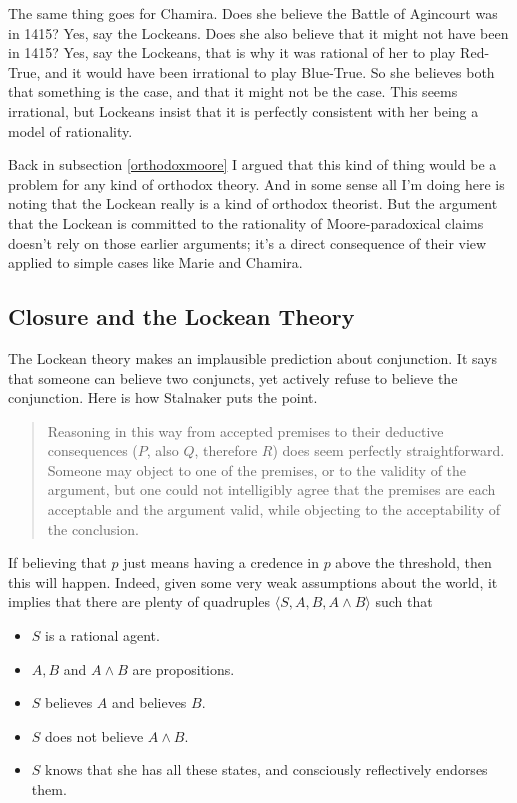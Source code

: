\documentclass[11pt,]{book}
\providecommand{\tightlist}{%
  \setlength{\itemsep}{0pt}\setlength{\parskip}{0pt}}
\begin{document}
The same thing goes for Chamira. Does she believe the Battle of Agincourt was in 1415? Yes, say the Lockeans. Does she also believe that it might not have been in 1415? Yes, say the Lockeans, that is why it was rational of her to play Red-True, and it would have been irrational to play Blue-True. So she believes both that something is the case, and that it might not be the case. This seems irrational, but Lockeans insist that it is perfectly consistent with her being a model of rationality.

Back in subsection \ref{orthodoxmoore} I argued that this kind of thing would be a problem for any kind of orthodox theory. And in some sense all I'm doing here is noting that the Lockean really is a kind of orthodox theorist. But the argument that the Lockean is committed to the rationality of Moore-paradoxical claims doesn't rely on those earlier arguments; it's a direct consequence of their view applied to simple cases like Marie and Chamira.

\hypertarget{closure}{%
\subsection{Closure and the Lockean Theory}\label{closure}}

The Lockean theory makes an implausible prediction about conjunction. It says that someone can believe two conjuncts, yet actively refuse to believe the conjunction. Here is how Stalnaker puts the point.

\begin{quote}
Reasoning in this way from accepted premises to their deductive consequences (\(P\), also \(Q\), therefore \(R\)) does seem perfectly straightforward. Someone may object to one of the premises, or to the validity of the argument, but one could not intelligibly agree that the premises are each acceptable and the argument valid, while objecting to the acceptability of the conclusion. \citep[ 92]{Stalnaker1984}
\end{quote}

If believing that \(p\) just means having a credence in \(p\) above the threshold, then this will happen. Indeed, given some very weak assumptions about the world, it implies that there are plenty of quadruples \(\langle S, A, B, A \wedge B \rangle\) such that

\begin{itemize}
\tightlist
\item
  \(S\) is a rational agent.
\item
  \(A, B\) and \(A \wedge B\) are propositions.
\item
  \(S\) believes \(A\) and believes \(B\).
\item
  \(S\) does not believe \(A \wedge B\).
\item
  \(S\) knows that she has all these states, and consciously reflectively
  endorses them.
\end{itemize}
\end{document}
